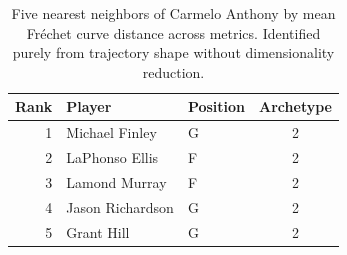 \begin{table}[htbp]
  \centering\small
  \begin{tabular}{rllc}
    \toprule
    Rank & Player & Position & Archetype \\
    \midrule
    1 & Michael Finley & G & 2 \\
    2 & LaPhonso Ellis & F & 2 \\
    3 & Lamond Murray & F & 2 \\
    4 & Jason Richardson & G & 2 \\
    5 & Grant Hill & G & 2 \\
    \bottomrule
  \end{tabular}
  \caption{Five nearest neighbors of Carmelo Anthony by mean Fr\'{e}chet curve distance across metrics. Identified purely from trajectory shape without dimensionality reduction.}
  \label{tab:Carmelo_Anthony_frechet_curve_neighbors}
\end{table}

